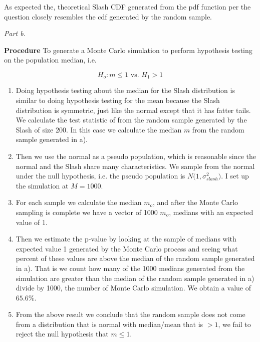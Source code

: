 \documentclass[12pt,a4paper]{article}
\begin{document}
As expected the, theoretical Slash CDF generated from the pdf function per the question closely resembles the cdf generated by the random sample.

\textit{Part b.}

\textbf{Procedure}
To generate a Monte Carlo simulation  to perform hypothesis testing on the population median, i.e.

\[H_o: m\leq 1\text{ vs. }H_1 > 1\]

\begin{enumerate}
\item{
Doing hypothesis testing about the median for the Slash distribution is similar to doing hypothesis testing for the mean because the Slash distribution is symmetric, just like the normal except that it has fatter tails.\\

We calculate the test statistic of from the random sample generated by the Slash of size $200$. In this case we calculate the median $m$ from the random sample generated in a).
}

\item{
Then we use the normal as a pseudo population, which is reasonable since the normal and the Slash share many characteristics. We sample from the normal under the null hypothesis, i.e. the pseudo population is $N\bigr(1,\sigma^2_{slash}\bigr)$. I set up the simulation at $M=1000$.
}

\item{
For each sample we calculate the median $m_o$, and after the Monte Carlo sampling is complete we have a vector of 1000 $m_o$, medians with an expected value of 1.
}

\item{
Then we estimate the p-value by looking at the sample of medians with expected value 1 generated by the Monte Carlo process and seeing what percent of these values are above the median of the random sample generated in a). That is we count how many of the 1000 medians generated from the simulation are greater than the median of the random sample generated in a) divide by 1000, the number of Monte Carlo simulation. We obtain a value of $65.6\%$. 
}

\item{
From the above result we conclude that the random sample does not come from a distribution that is normal with median/mean that is $>1$, we fail to reject the null hypothesis that $m\leq1$.
}


\end{enumerate}
\end{document}
